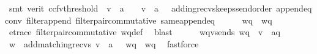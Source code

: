 \begin{isabellebody}
\ {\isacharparenleft}{\kern0pt}smt\ {\isacharparenleft}{\kern0pt}verit{\isacharcomma}{\kern0pt}\ ccfv{\isacharunderscore}{\kern0pt}threshold{\isacharparenright}{\kern0pt}\ \ {\isacartoucheopen}v\ {\isasymsqdot}\ a\ {\isacharhash}{\kern0pt}\ {\isasymepsilon}\ {\isacharequal}{\kern0pt}\ {\isacharparenleft}{\kern0pt}v\ {\isasymsqdot}\ a\ {\isacharhash}{\kern0pt}\ {\isasymepsilon}{\isacharparenright}{\kern0pt}{\isasymdown}\isactrlsub {\isacharbang}{\kern0pt}{\isacartoucheclose}\ adding{\isacharunderscore}{\kern0pt}recvs{\isacharunderscore}{\kern0pt}keeps{\isacharunderscore}{\kern0pt}send{\isacharunderscore}{\kern0pt}order\ append{}{\isacharunderscore}{\kern0pt}eq{\isacharunderscore}{\kern0pt}conv\ filter{\isacharunderscore}{\kern0pt}append\ filter{\isacharunderscore}{\kern0pt}pair{\isacharunderscore}{\kern0pt}commutative\ same{\isacharunderscore}{\kern0pt}append{\isacharunderscore}{\kern0pt}eq{\isacharparenright}{\kern0pt}\isanewline
\ \ \ \ \isamarkupfalse%
\ {\isachardoublequoteopen}wq{\isasymdown}\isactrlsub {\isacharbang}{\kern0pt}\ {\isacharequal}{\kern0pt}\ w{\isasymdown}\isactrlsub q{\isachardoublequoteclose}\ \isamarkupfalse%
\ e{\isacharunderscore}{\kern0pt}trace\ filter{\isacharunderscore}{\kern0pt}pair{\isacharunderscore}{\kern0pt}commutative\ wq{\isacharunderscore}{\kern0pt}def\ \isamarkupfalse%
\ blast\isanewline
\ \ \ \ \isamarkupfalse%
\ wq{\isacharunderscore}{\kern0pt}v{\isacharprime}{\kern0pt}{\isacharunderscore}{\kern0pt}sends{\isacharcolon}{\kern0pt}\ {\isachardoublequoteopen}wq{\isasymdown}\isactrlsub {\isacharbang}{\kern0pt}\ {\isacharequal}{\kern0pt}\ {\isacharparenleft}{\kern0pt}{\isacharparenleft}{\kern0pt}{\isacharquery}{\kern0pt}v{\isacharprime}{\kern0pt}{\isacharparenright}{\kern0pt}{\isasymdown}\isactrlsub {\isacharbang}{\kern0pt}\ {\isasymsqdot}\ {\isacharbrackleft}{\kern0pt}a{\isacharbrackright}{\kern0pt}{\isacharparenright}{\kern0pt}{\isasymdown}\isactrlsub q{\isachardoublequoteclose}\ \isamarkupfalse%
\ {\isacartoucheopen}w\ {\isacharequal}{\kern0pt}\ add{\isacharunderscore}{\kern0pt}matching{\isacharunderscore}{\kern0pt}recvs\ v{\isasymdown}\isactrlsub {\isacharbang}{\kern0pt}\ {\isasymsqdot}\ a\ {\isacharhash}{\kern0pt}\ {\isasymepsilon}{\isacartoucheclose}\ {\isacartoucheopen}wq{\isasymdown}\isactrlsub {\isacharbang}{\kern0pt}\ {\isacharequal}{\kern0pt}\ w{\isasymdown}\isactrlsub q{\isacartoucheclose}\ \isamarkupfalse%
\ fastforce\isanewline
\ \ \ \ \isamarkupfalse%

\end{isabellebody}
